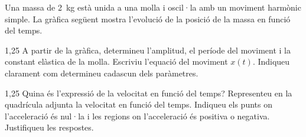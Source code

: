 Una massa de 2~kg està unida a una molla i oscil·la amb un moviment harmònic simple. La gràfica següent mostra l'evolució de la posició de la massa en funció del temps.


\begin{apartat}{1,25}
A partir de la gràfica, determineu l'amplitud, el període del moviment i la constant elàstica de la molla. Escriviu l'equació del moviment $x(t)$. Indiqueu clarament com determineu cadascun dels paràmetres.
\end{apartat}

\begin{apartat}{1,25}
Quina és l'expressió de la velocitat en funció del temps? Representeu en la quadrícula adjunta la velocitat en funció del temps. Indiqueu els punts on l'acceleració és nul·la i les regions on l'acceleració és positiva o negativa. Justifiqueu les respostes.
\end{apartat}

